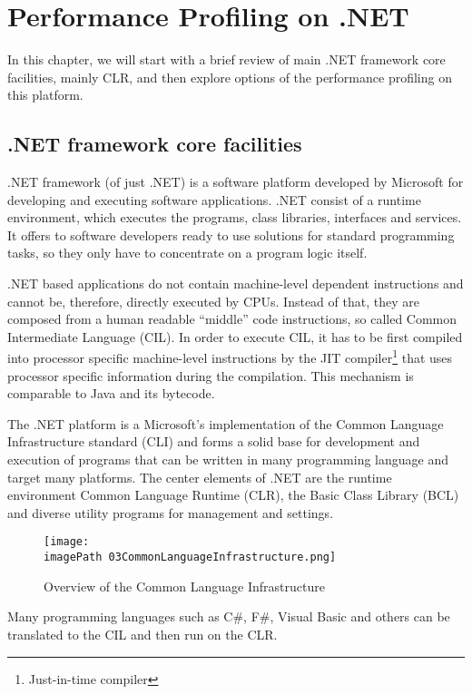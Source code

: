 
\chapter{Performance Profiling on .NET}
\label{chapPerProfOnDotNet}

In this chapter, we will start with a brief review of main .NET framework core facilities, mainly CLR, and then explore options of the performance profiling on this platform. 

\section{.NET framework core facilities}
.NET framework (of just .NET) is a software platform developed by Microsoft for developing and executing software applications. .NET  consist of a runtime environment, which executes the programs, class libraries, interfaces and services. It offers to software developers ready to use solutions for standard programming tasks, so they only have to concentrate on a program logic itself.

.NET based applications do not contain machine-level dependent instructions and cannot be, therefore, directly executed by CPUs. Instead of that, they are composed from a human readable ``middle'' code instructions, so called Common Intermediate Language (CIL). In order to execute CIL, it has to be first compiled into processor specific machine-level instructions by the JIT compiler\footnote{Just-in-time compiler} that uses processor specific information during the compilation. This mechanism is comparable to Java and its bytecode.

The .NET platform is a Microsoft's implementation of the Common Language Infrastructure standard (CLI) and forms a solid base for development and execution of programs that can be written in many programming language and target many platforms. The center elements of .NET are the runtime environment Common Language Runtime (CLR), the Basic Class Library (BCL) and diverse utility programs for management and settings.

\begin{figure}
	\centering
		\texttt{[image: \\imagePath 03CommonLanguageInfrastructure.png]}
		\caption{Overview of the Common Language Infrastructure \cite{OCLI} }
	\label{fig:03CommonLanguageInfrastructure}
\end{figure}

Many programming languages such as C\#, F\#, Visual Basic and others can be translated to the CIL and then run on the CLR. 


